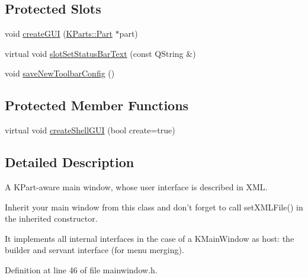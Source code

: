 \subsection*{\-Protected \-Slots}
\begin{DoxyCompactItemize}
\item 
void \hyperlink{classKParts_1_1MainWindow_ac9064b03c5b9c86676e107f0dd80693b}{create\-G\-U\-I} (\hyperlink{classKParts_1_1Part}{\-K\-Parts\-::\-Part} $\ast$part)
\item 
virtual void \hyperlink{classKParts_1_1MainWindow_a97b2f32ff0736617b5385274782dd26a}{slot\-Set\-Status\-Bar\-Text} (const \-Q\-String \&)
\item 
void \hyperlink{classKParts_1_1MainWindow_a7ee678f5096405ef023e49390013c0af}{save\-New\-Toolbar\-Config} ()
\end{DoxyCompactItemize}
\subsection*{\-Protected \-Member \-Functions}
\begin{DoxyCompactItemize}
\item 
virtual void \hyperlink{classKParts_1_1MainWindow_ac388eb6552660ee055c1d41e5f217553}{create\-Shell\-G\-U\-I} (bool create=true)
\end{DoxyCompactItemize}


\subsection{\-Detailed \-Description}
\-A \-K\-Part-\/aware main window, whose user interface is described in \-X\-M\-L.

\-Inherit your main window from this class and don't forget to call set\-X\-M\-L\-File() in the inherited constructor.

\-It implements all internal interfaces in the case of a \-K\-Main\-Window as host\-: the builder and servant interface (for menu merging). 

\-Definition at line 46 of file mainwindow.\-h.



